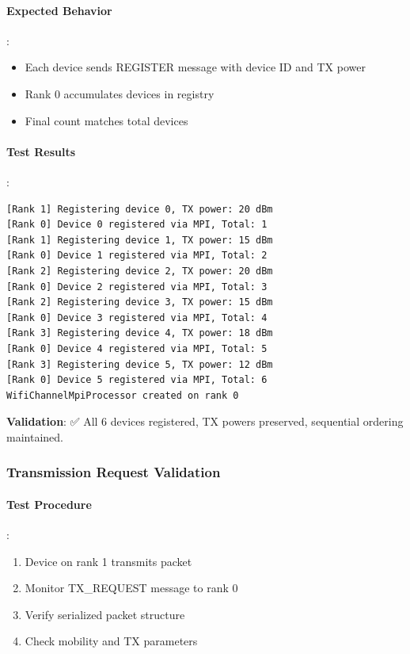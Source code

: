 \paragraph{Expected Behavior}:
\begin{itemize}
    \item Each device sends REGISTER message with device ID and TX power
    \item Rank 0 accumulates devices in registry
    \item Final count matches total devices
\end{itemize}

\paragraph{Test Results}:
\begin{lstlisting}[style=log]
[Rank 1] Registering device 0, TX power: 20 dBm
[Rank 0] Device 0 registered via MPI, Total: 1
[Rank 1] Registering device 1, TX power: 15 dBm
[Rank 0] Device 1 registered via MPI, Total: 2
[Rank 2] Registering device 2, TX power: 20 dBm
[Rank 0] Device 2 registered via MPI, Total: 3
[Rank 2] Registering device 3, TX power: 15 dBm
[Rank 0] Device 3 registered via MPI, Total: 4
[Rank 3] Registering device 4, TX power: 18 dBm
[Rank 0] Device 4 registered via MPI, Total: 5
[Rank 3] Registering device 5, TX power: 12 dBm
[Rank 0] Device 5 registered via MPI, Total: 6
WifiChannelMpiProcessor created on rank 0
\end{lstlisting}

\textbf{Validation}: ✅ All 6 devices registered, TX powers preserved, sequential ordering maintained.

\subsubsection{Transmission Request Validation}

\paragraph{Test Procedure}:
\begin{enumerate}
    \item Device on rank 1 transmits packet
    \item Monitor TX\_REQUEST message to rank 0
    \item Verify serialized packet structure
    \item Check mobility and TX parameters
\end{enumerate}


